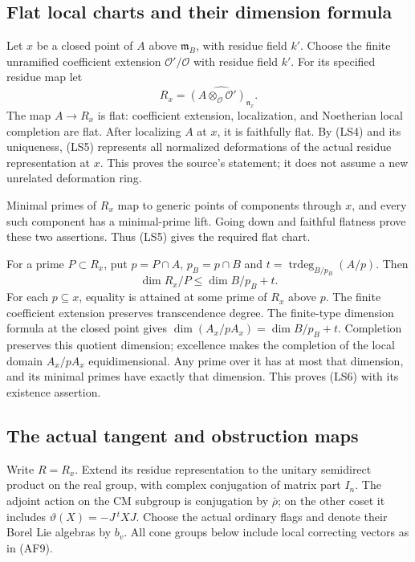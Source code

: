 \subsection{Flat local charts and their dimension formula}
Let \(x\) be a closed point of \(A\) above
\(\mathfrak m_B\), with residue field \(k'\).
Choose the finite unramified coefficient extension
\(\mathcal O'/\mathcal O\) with residue field \(k'\).
For its specified residue map let
\[
 R_x=\widehat{(A\otimes_{\mathcal O}\mathcal O')_{\mathfrak n_x}}.
                                                               \tag{LS5}
\]
The map \(A\to R_x\) is flat: coefficient extension,
localization, and Noetherian local completion
are flat.
After localizing \(A\) at \(x\), it is faithfully
flat.
By (LS4) and its uniqueness, (LS5) represents
all normalized deformations of the actual
residue representation at \(x\).
This proves the source's  statement;
it does not assume a new unrelated deformation
ring.

Minimal primes of \(R_x\) map to generic points
of components through \(x\), and every such
component has a minimal-prime lift.
Going down and faithful flatness prove these
two assertions.
Thus (LS5) gives the required flat chart.

For a prime \(P\subset R_x\), put \(p=P\cap A\),
\(p_B=p\cap B\) and
\(t=\operatorname{trdeg}_{B/p_B}(A/p)\).
Then
\[
                       \dim R_x/P\le\dim B/p_B+t.             \tag{LS6}
\]
For each \(p\subseteq x\), equality is attained
at some prime of \(R_x\) above \(p\).
The finite coefficient extension preserves
transcendence degree.
The finite-type dimension formula at the closed
point gives
\(\dim(A_x/pA_x)=\dim B/p_B+t\).
Completion preserves this quotient dimension;
excellence makes the completion of the local
domain \(A_x/pA_x\) equidimensional.
Any prime over it has at most that dimension,
and its minimal primes have exactly that
dimension.
This proves (LS6) with its existence assertion.

\subsection{The actual tangent and obstruction maps}
Write \(R=R_x\).
Extend its residue representation to the unitary
semidirect product on the real group, with
complex conjugation of matrix part \(I_n\).
The adjoint action on the CM subgroup is
conjugation by \(\bar\rho\); on the other coset
it includes \(\vartheta(X)=-J\,{}^tXJ\).
Choose the actual ordinary flags and denote
their Borel Lie algebras by \(b_v\).
All cone groups below include local correcting
vectors as in (AF9).

